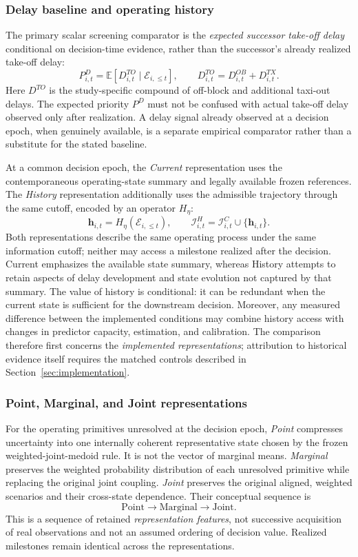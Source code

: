 \subsubsection{Delay baseline and operating history}

The primary scalar screening comparator is the \emph{expected successor take-off delay} conditional on decision-time evidence, rather than the successor's already realized take-off delay:
\[
P^D_{i,t}
=\mathbb E\!\left[D^{TO}_{i,t}\mid\mathcal E_{i,\leq t}\right],
\qquad
D^{TO}_{i,t}=D^{OB}_{i,t}+D^{TX}_{i,t}.
\]
Here $D^{TO}$ is the study-specific compound of off-block and additional taxi-out delays. The expected priority $P^D$ must not be confused with actual take-off delay observed only after realization. A delay signal already observed at a decision epoch, when genuinely available, is a separate empirical comparator rather than a substitute for the stated baseline.

At a common decision epoch, the \emph{Current} representation uses the contemporaneous operating-state summary and legally available frozen references. The \emph{History} representation additionally uses the admissible trajectory through the same cutoff, encoded by an operator $H_\eta$:
\[
\mathbf h_{i,t}=H_\eta\!\left(\mathcal E_{i,\leq t}\right),
\qquad
\mathcal I^H_{i,t}=\mathcal I^C_{i,t}\cup\{\mathbf h_{i,t}\}.
\]
Both representations describe the same operating process under the same information cutoff; neither may access a milestone realized after the decision. Current emphasizes the available state summary, whereas History attempts to retain aspects of delay development and state evolution not captured by that summary. The value of history is conditional: it can be redundant when the current state is sufficient for the downstream decision. Moreover, any measured difference between the implemented conditions may combine history access with changes in predictor capacity, estimation, and calibration. The comparison therefore first concerns the \emph{implemented representations}; attribution to historical evidence itself requires the matched controls described in Section~\ref{sec:implementation}.

\subsubsection{Point, Marginal, and Joint representations}

For the operating primitives unresolved at the decision epoch, \emph{Point} compresses uncertainty into one internally coherent representative state chosen by the frozen weighted-joint-medoid rule. It is not the vector of marginal means. \emph{Marginal} preserves the weighted probability distribution of each unresolved primitive while replacing the original joint coupling. \emph{Joint} preserves the original aligned, weighted scenarios and their cross-state dependence. Their conceptual sequence is
\[
\mathrm{Point}\longrightarrow\mathrm{Marginal}\longrightarrow\mathrm{Joint}.
\]
This is a sequence of retained \emph{representation features}, not successive acquisition of real observations and not an assumed ordering of decision value. Realized milestones remain identical across the representations.

